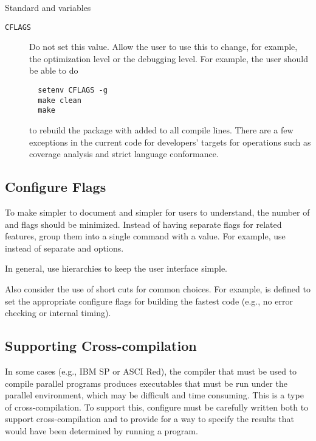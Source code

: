 \documentclass{article}
\begin{document}
Standard  and  variables
\begin{description}

\item[\texttt{CFLAGS}]Do not set this value.  Allow the user to use this to
  change, for example, the optimization level or the debugging level.  For
  example, the user should be able to do
\begin{verbatim}
  setenv CFLAGS -g
  make clean
  make
\end{verbatim}
  to rebuild the package with  added to all compile lines.
  There are a few exceptions in the current code for developers'
  targets for operations such as coverage analysis and strict language
  conformance.  
\end{description}

\subsection{Configure Flags}
\label{sec:config-flags}
To make  simpler to document and simpler for users to
understand, the number of  and  flags should be
minimized.  Instead of having separate  flags for related
features, group them into a single  command with a value.
For example, use  instead of separate
 and  options.  

In general, use hierarchies to keep the user interface simple.

Also consider the use of short cuts for common choices.  For example, 
 is defined to set the appropriate configure
flags for building the fastest code (e.g., no error checking or
internal timing).

\subsection{Supporting Cross-compilation}
\label{sec:cross-compile}
In some cases (e.g., IBM SP or ASCI Red), the compiler that must be used to
compile parallel programs produces executables that must be run under
the parallel environment, which may be difficult and time consuming.
This is a type of cross-compilation.  To support this, configure must
be carefully written both to support cross-compilation and to provide
for a way to specify the results that would have been determined by
running a program.
\end{document}
